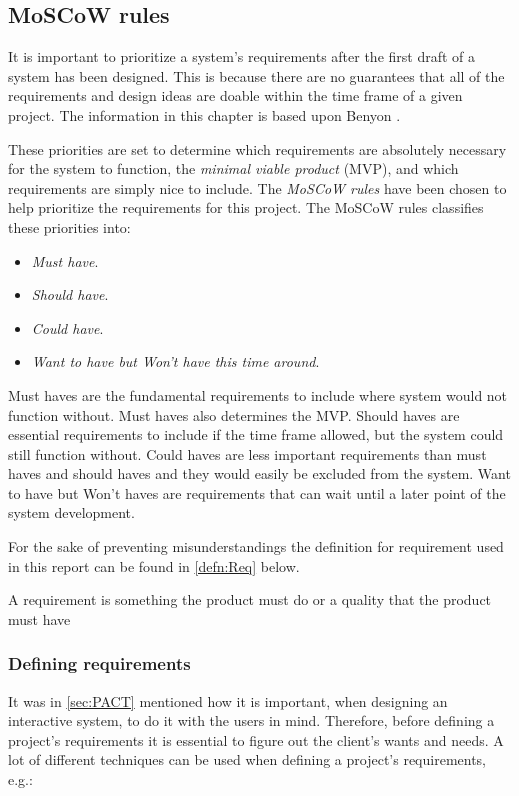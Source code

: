 \subsection{MoSCoW rules}\label{sec:requirements}
It is important to prioritize a system's requirements after the first draft of a system has been designed.
This is because there are no guarantees that all of the requirements and design ideas are doable within the time frame of a given project.
The information in this chapter is based upon Benyon \cite{Benyon}.

These priorities are set to determine which requirements are absolutely necessary for the system to function, the \textit{minimal viable product} (MVP),
and which requirements are simply nice to include.
The \textit{MoSCoW rules}
have been chosen to help prioritize the requirements for this project.
The MoSCoW rules classifies these priorities into:

\begin{itemize}
    \item \textit{Must have}.
    \item \textit{Should have}.
    \item \textit{Could have}.
    \item \textit{Want to have but Won’t have this time around}.
\end{itemize}

Must haves are the fundamental requirements to include where system would not function without.
Must haves also determines the MVP.
Should haves are essential requirements to include if the time frame allowed, but the system could still function without.
Could haves are less important requirements than must haves and should haves and they would easily be excluded from the system.
Want to have but Won't haves are requirements that can wait until a later point of the system development.

For the sake of preventing misunderstandings the definition for requirement used in this report \citep[p.~147]{Benyon} can be found in \cref{defn:Req} below.

\begin{defn}\label{defn:Req}
    A requirement is something the product must do or a quality that the product must have
\end{defn}

\subsubsection{Defining requirements} \label{sec:requirementsdefinition}
It was in \cref{sec:PACT} mentioned how it is important, when designing an interactive system, to do it with the users in mind.
Therefore, before defining a project's requirements it is essential to figure out the client's wants and needs.
A lot of different techniques can be used when defining a project's requirements, e.g.:

